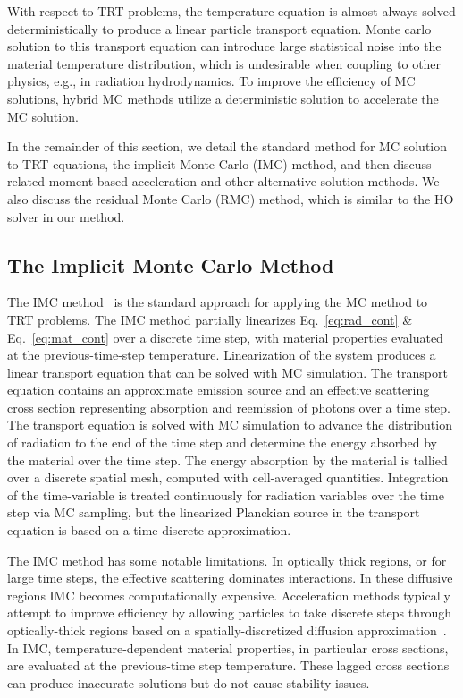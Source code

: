 With respect to TRT problems, the temperature equation is almost always solved
deterministically to produce a linear particle transport equation. Monte carlo solution to
this transport equation can introduce large statistical
noise into the material temperature distribution, which is undesirable when coupling to
other physics, e.g., in radiation hydrodynamics.  To improve the efficiency of MC solutions, hybrid MC methods utilize a
deterministic solution to accelerate the MC solution.  

In the remainder of this section, we detail the standard method for MC solution to TRT
equations, the implicit Monte Carlo (IMC) method, and then discuss related moment-based acceleration and other
alternative solution methods.  We also discuss the residual Monte Carlo (RMC) method, which is
similar to the HO solver in our method.

\subsection{The Implicit Monte Carlo Method}
\label{sec:imc}

The IMC method~\cite{fnc,wollaber_review} is the standard approach for applying the MC
method to TRT problems.  The IMC method partially linearizes Eq.~\eqref{eq:rad_cont} \&
Eq.~\eqref{eq:mat_cont} over a discrete time step, with material properties evaluated at
the previous-time-step temperature.  Linearization of the system produces a linear
transport equation that can be solved with MC simulation.  The transport equation contains
an approximate emission source and an effective scattering cross section representing
absorption and reemission of photons over a time step.  The transport equation is solved
with MC simulation to advance the distribution of radiation to the end of the time step
and determine the energy absorbed by the material over the time step.  The energy
absorption by the material is tallied over a discrete spatial mesh, computed with
cell-averaged quantities.  Integration of the time-variable is treated continuously for
radiation variables over the time step via MC sampling, but the linearized Planckian
source in the transport equation is based on a time-discrete approximation. 

The IMC method has some notable limitations.  In optically thick regions, or for large time steps,
the effective scattering dominates interactions.  In these diffusive regions IMC becomes
computationally expensive. Acceleration methods typically attempt to improve efficiency by
allowing particles to take discrete steps through optically-thick regions based on a
spatially-discretized diffusion approximation~\cite{imd,ddmc}. 
In IMC, temperature-dependent material
properties, in particular cross sections, are evaluated at the previous-time step
temperature. These lagged cross sections can produce inaccurate solutions but do not cause
stability issues.  

